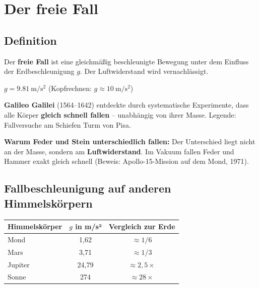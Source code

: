 \documentclass[11pt, a4paper]{article}
\newcommand{\wichtig}[1]{\textcolor{physik}{\textbf{#1}}}
\begin{document}
\section{Der freie Fall}

\subsection{Definition}

\begin{merksatz}
Der \wichtig{freie Fall} ist eine gleichmäßig beschleunigte Bewegung unter dem Einfluss der Erdbeschleunigung $g$. Der Luftwiderstand wird vernachlässigt.

\begin{center}
{\Large $g = \SI{9,81}{\metre\per\second\squared}$} \quad (Kopfrechnen: $g \approx \SI{10}{\metre\per\second\squared}$)
\end{center}
\end{merksatz}

\begin{beispielbox}[title=Historischer Hintergrund: Galileo Galilei]
\textbf{Galileo Galilei} (1564--1642) entdeckte durch systematische Experimente, dass alle Körper \textbf{gleich schnell fallen} -- unabhängig von ihrer Masse. Legende: Fallversuche am Schiefen Turm von Pisa.

\textbf{Warum Feder und Stein unterschiedlich fallen:}
Der Unterschied liegt nicht an der Masse, sondern am \textbf{Luftwiderstand}. Im Vakuum fallen Feder und Hammer exakt gleich schnell (Beweis: Apollo-15-Mission auf dem Mond, 1971).
\end{beispielbox}

\subsection{Fallbeschleunigung auf anderen Himmelskörpern}

\begin{center}
\begin{tabular}{|l|c|c|}
\hline
\textbf{Himmelskörper} & \textbf{$g$ in m/s²} & \textbf{Vergleich zur Erde} \\
\hline
Mond & 1,62 & $\approx 1/6$ \\
Mars & 3,71 & $\approx 1/3$ \\
Jupiter & 24,79 & $\approx 2,5\times$ \\
Sonne & 274 & $\approx 28\times$ \\
\hline
\end{tabular}
\end{center}
\end{document}
